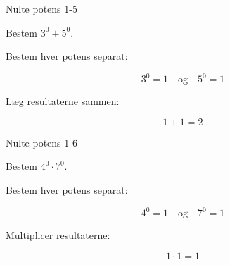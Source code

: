 \documentclass{article}
\begin{document}
\begin{exercise}{Nulte potens 1-5}

Bestem $3^0 + 5^0$.


\hint

Bestem hver potens separat:

\hint
\[
3^0 = 1 \quad \text{og} \quad 5^0 = 1
\]

\hint

Læg resultaterne sammen:

\hint
\[
1 + 1 = 2
\]

\end{exercise}

\newpage

\begin{exercise}{Nulte potens 1-6}

Bestem $4^0 \cdot 7^0$.


\hint

Bestem hver potens separat:

\hint
\[
4^0 = 1 \quad \text{og} \quad 7^0 = 1
\]

\hint

Multiplicer resultaterne:

\hint
\[
1 \cdot 1 = 1
\]

\end{exercise}
\end{document}
